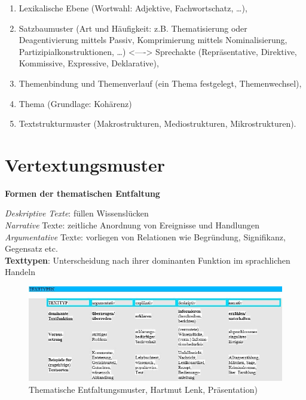 \documentclass[
  letterpaper,
]{scrbook}
\providecommand{\tightlist}{%
  \setlength{\itemsep}{0pt}\setlength{\parskip}{0pt}}\usepackage{longtable,booktabs,array}
\begin{document}
\begin{enumerate}
\def\labelenumi{\roman{enumi}.}
\setcounter{enumi}{1}
\tightlist
\item
  Lexikalische Ebene (Wortwahl: Adjektive, Fachwortschatz, \ldots),\\
\item
  Satzbaumuster (Art und Häufigkeit: z.B. Thematisierung oder
  Deagentivierung mittels Passiv, Komprimierung mittels Nominalisierung,
  Partizipialkonstruktionen, \ldots) \textless----\textgreater{}
  Sprechakte (Repräsentative, Direktive, Kommissive, Expressive,
  Deklarative),\\
\item
  Themenbindung und Themenverlauf (ein Thema festgelegt,
  Themenwechsel),\\
\item
  Thema (Grundlage: Kohärenz)\\
\item
  Textstrukturmuster (Makrostrukturen, Mediostrukturen,
  Mikrostrukturen).\\
\end{enumerate}

\hypertarget{vertextungsmuster}{%
\section{Vertextungsmuster}\label{vertextungsmuster}}

\textbf{Formen der thematischen Entfaltung}

\emph{Deskriptive Texte}: füllen Wissenslücken\\
\emph{Narrative} Texte: zeitliche Anordnung von Ereignisse und
Handlungen\\
\emph{Argumentative} Texte: vorliegen von Relationen wie Begründung,
Signifikanz, Gegensatz etc.\\

\textbf{Texttypen}: Unterscheidung nach ihrer dominanten Funktion im
sprachlichen Handeln\\

\begin{figure}

{\centering \includegraphics[width=1\textwidth,height=\textheight]{./pictures/thematische_entfaltung.jpg}

}

\caption{Thematische Entfaltungsmuster, Hartmut Lenk, Präsentation)}

\end{figure}
\end{document}
